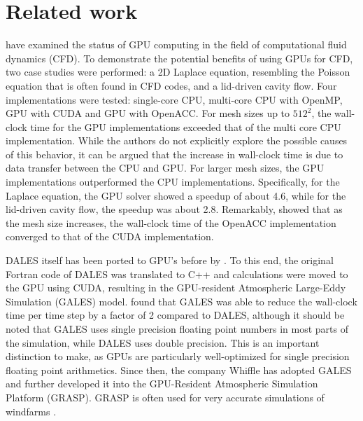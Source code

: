 \section{Related work}

\citet{niemeyerRecentProgressChallenges2014} have examined the status of GPU computing in the field of computational fluid dynamics (CFD). To demonstrate the potential benefits of using GPUs for CFD, two case studies were performed: a 2D Laplace equation, resembling the Poisson equation that is often found in CFD codes, and a lid-driven cavity flow. Four implementations were tested: single-core CPU, multi-core CPU with OpenMP, GPU with CUDA and GPU with OpenACC. For mesh sizes up to $512^2$, the wall-clock time for the GPU implementations exceeded that of the multi core CPU implementation. While the authors do not explicitly explore the possible causes of this behavior, it can be argued that the increase in wall-clock time is due to data transfer between the CPU and GPU. For larger mesh sizes, the GPU implementations outperformed the CPU implementations. Specifically, for the Laplace equation, the GPU solver showed a speedup of about 4.6, while for the lid-driven cavity flow, the speedup was about 2.8. Remarkably, \citet{niemeyerRecentProgressChallenges2014} showed that as the mesh size increases, the wall-clock time of the OpenACC implementation converged to that of the CUDA implementation.

DALES itself has been ported to GPU's before by \citet{schalkwijkHighPerformanceSimulationsTurbulent2012}. To this end, the original Fortran code of DALES was translated to C++ and calculations were moved to the GPU using CUDA, resulting in the GPU-resident Atmospheric Large-Eddy Simulation (GALES) model. \citet{schalkwijkHighPerformanceSimulationsTurbulent2012} found that GALES was able to reduce the wall-clock time per time step by a factor of 2 compared to DALES, although it should be noted that GALES uses single precision floating point numbers in most parts of the simulation, while DALES uses double precision. This is an important distinction to make, as GPUs are particularly well-optimized for single precision floating point arithmetics. Since then, the company Whiffle has adopted GALES and further developed it into the GPU-Resident Atmospheric Simulation Platform (GRASP). GRASP is often used for very accurate simulations of windfarms \citep{verzijlberghAtmosphericFlowsLarge2021}.

